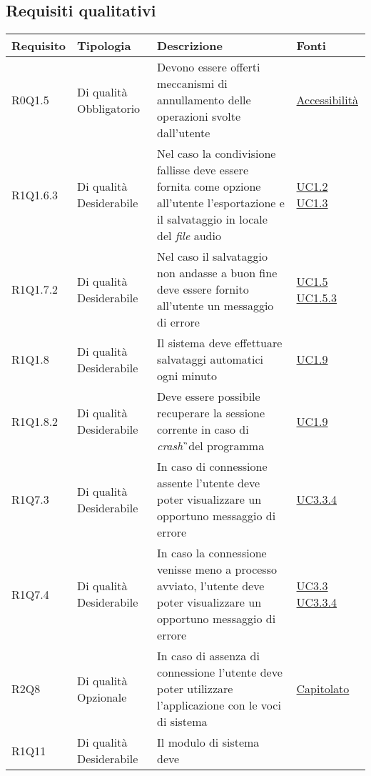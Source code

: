 \begin{center}
\begin{longtable}{| p{2.5cm} | p{3cm} | p{5.25cm} | p{2cm} |}
\end{longtable}
\egroup
\end{center} \newpage \subsection{Requisiti qualitativi}
\begin{center}
\def\arraystretch{1.6}
\bgroup
\begin{longtable}{| p{2.5cm} | p{3cm} | p{5.25cm} | p{2cm} |}
\hline
\textbf{Requisito} & \textbf{Tipologia} & \textbf{Descrizione} & \textbf{Fonti}\\ \hline \hline  R0Q1.5 & Di qualità \newline Obbligatorio & Devono essere offerti meccanismi di annullamento delle operazioni svolte dall'utente &  \hyperref[sec:Accessibilità ]{ Accessibilità  }  \\ \hline  R1Q1.6.3 & Di qualità \newline Desiderabile & Nel caso la condivisione fallisse deve essere fornita come opzione all'utente l'esportazione e il salvataggio in locale del \textit{file} audio &  \hyperref[sec:UC1.2]{ UC1.2 } \newline \hyperref[sec:UC1.3]{ UC1.3 }  \\ \hline  R1Q1.7.2 & Di qualità  \newline Desiderabile & Nel caso il salvataggio non andasse a buon fine deve essere fornito all'utente un messaggio di errore &  \hyperref[sec:UC1.5]{ UC1.5 } \newline \hyperref[sec:UC1.5.3]{ UC1.5.3 }  \\ \hline  R1Q1.8 & Di qualità  \newline Desiderabile & Il sistema deve effettuare salvataggi automatici ogni minuto &  \hyperref[sec:UC1.9]{ UC1.9 }  \\ \hline  R1Q1.8.2 & Di qualità \newline Desiderabile & Deve essere possibile recuperare la sessione corrente in caso di \textit{crash}\G\ del programma &  \hyperref[sec:UC1.9]{ UC1.9 }  \\ \hline  R1Q7.3 & Di qualità  \newline Desiderabile & In caso di connessione assente l'utente deve poter visualizzare un opportuno messaggio di errore &  \hyperref[sec:UC3.3.4]{ UC3.3.4 }  \\ \hline  R1Q7.4 & Di qualità  \newline Desiderabile & In caso la connessione venisse meno a processo avviato, l'utente deve poter visualizzare un opportuno messaggio di errore &  \hyperref[sec:UC3.3]{ UC3.3 } \newline \hyperref[sec:UC3.3.4]{ UC3.3.4 }  \\ \hline  R2Q8 & Di qualità  \newline Opzionale & In caso di assenza di connessione l'utente deve poter utilizzare l'applicazione con le voci di sistema &  \hyperref[sec:Capitolato]{ Capitolato }  \\ \hline  R1Q11 & Di qualità  \newline Desiderabile & Il modulo di sistema deve 
\end{longtable}
\end{center}
